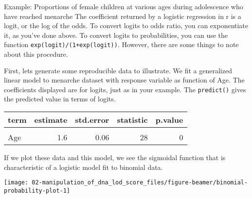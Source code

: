 \documentclass[11pt,dvipsnames,ignorenonframetext,aspectratio=169]{beamer}
\begin{document}
\begin{frame}[fragile]{Example: Proportions of female children at
various ages during adolescence who have reached menarche}
\protect\hypertarget{example-proportions-of-female-children-at-various-ages-during-adolescence-who-have-reached-menarche}{}
The coefficient returned by a logistic regression in r is a logit, or
the log of the odds. To convert logits to odds ratio, you can
exponentiate it, as you've done above. To convert logits to
probabilities, you can use the function
\texttt{exp(logit)/(1+exp(logit))}. However, there are some things to
note about this procedure.

First, lets generate some reproducible data to illustrate. We fit a
generalized linear model to menarche dataset with response variable as
function of Age. The coefficients displayed are for logits, just as in
your example. The \texttt{predict()} gives the predicted value in terms
of logits.
\end{frame}

\begin{frame}{}
\protect\hypertarget{section-12}{}
\begin{table}
\centering\begingroup\fontsize{6}{8}\selectfont

\begin{tabular}{lrrrr}
\toprule
term & estimate & std.error & statistic & p.value\\
\midrule
\cellcolor{gray!6}{(Intercept)} & \cellcolor{gray!6}{-21.2} & \cellcolor{gray!6}{0.77} & \cellcolor{gray!6}{-28} & \cellcolor{gray!6}{0}\\
Age & 1.6 & 0.06 & 28 & 0\\
\bottomrule
\end{tabular}
\endgroup{}
\end{table}

If we plot these data and this model, we see the sigmoidal function that
is characteristic of a logistic model fit to binomial data.

\begin{center}\texttt{[image: 02-manipulation\_of\_dna\_lod\_score\_files/figure-beamer/binomial-probability-plot-1]} \end{center}
\end{frame}
\end{document}
